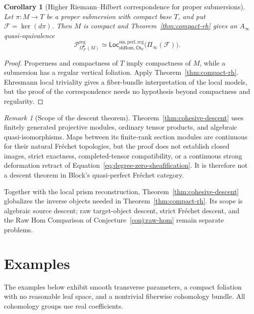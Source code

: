 \documentclass[12pt]{amsart}
\newtheorem{cor}[thm]{Corollary}
\theoremstyle{definition}
\theoremstyle{remark}
\newtheorem{rem}[thm]{Remark}
\numberwithin{equation}{section}
\newcommand{\CF}{{\mathcal F}}
\newcommand{\R}{{\mathbb{R}}}
\newcommand{\1}{{\mathbb{1}}}
\newcommand{\Ch}{\mathsf{Ch}}
\newcommand{\Loc}{\mathsf{Loc}}
\begin{document}
\begin{cor}[Higher Riemann--Hilbert correspondence for proper submersions]
\label{cor:proper-submersion}
Let $\pi:M\to T$ be a proper submersion with compact base $T$, and put
$\CF=\ker(d\pi)$.  Then $M$ is compact and
Theorem~\ref{thm:compact-rh} gives an $A_\infty$ quasi-equivalence
\[
 \mathcal P_{\Omega^\bullet_{\CF}(M)}^{\mathrm{reg}}
 \simeq
 \Loc_{\mathrm{shHom},\Ch_{\R}}^{\mathrm{sm,perf,reg}}
 \bigl(\Pi_\infty(\CF)\bigr).
\]
\end{cor}

\begin{proof}
Properness and compactness of $T$ imply compactness of $M$, while a
submersion has a regular vertical foliation.  Apply
Theorem~\ref{thm:compact-rh}.  Ehresmann local triviality gives a
fiber-bundle interpretation of the local models, but the proof of the
correspondence needs no hypothesis beyond compactness and regularity.
\end{proof}

\begin{rem}[Scope of the descent theorem]
\label{rem:descent-scope}
Theorem~\ref{thm:cohesive-descent} uses finitely generated projective
modules, ordinary tensor products, and algebraic quasi-isomorphisms.
Maps between its finite-rank section modules are continuous for their
natural Fr\'echet topologies, but the proof does not establish closed
images, strict exactness, completed-tensor compatibility, or a
continuous strong deformation retract of
Equation~\eqref{eq:degree-zero-sheafification}.  It is therefore not a
descent theorem in Block's quasi-perfect Fr\'echet category.
\end{rem}

Together with the local prism reconstruction,
Theorem~\ref{thm:cohesive-descent} globalizes the inverse objects
needed in Theorem~\ref{thm:compact-rh}.  Its scope is algebraic source
descent; raw target-object descent, strict Fr\'echet descent, and the
Raw Hom Comparison of Conjecture~\ref{conj:raw-hom} remain separate
problems.

\section{Examples}\label{sec:examples}

The examples below exhibit smooth transverse parameters, a compact
foliation with no reasonable leaf space, and a nontrivial fiberwise
cohomology bundle.  All cohomology groups use real coefficients.
\end{document}

